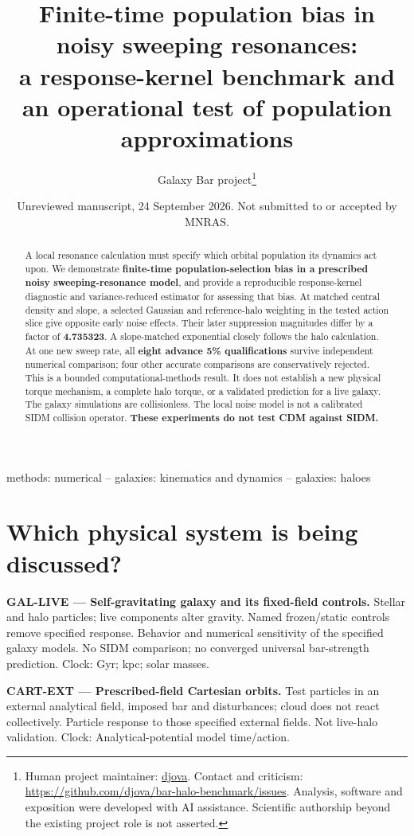 \documentclass[fleqn,usenatbib]{mnras}
\title[Population bias in noisy resonances]{Finite-time population bias in noisy sweeping resonances:\\
 a response-kernel benchmark and an operational test of population approximations}
\author[Galaxy Bar project]{Galaxy Bar project\thanks{Human project maintainer: \href{https://github.com/djova}{djova}.
Contact and criticism: \url{https://github.com/djova/bar-halo-benchmark/issues}.
Analysis, software and exposition were developed with AI assistance. Scientific authorship beyond the existing project role is not asserted.}}
\date{Unreviewed manuscript, 24 September 2026. Not submitted to or accepted by MNRAS.}
\begin{document}
\label{firstpage}
\pagerange{\pageref{firstpage}--\pageref{LastPage}}
\maketitle

\begin{abstract}
A local resonance calculation must specify which orbital population its dynamics act upon. We demonstrate \textbf{finite-time population-selection bias in a prescribed noisy sweeping-resonance model}, and provide a reproducible response-kernel diagnostic and variance-reduced estimator for assessing that bias. At matched central density and slope, a selected Gaussian and reference-halo weighting in the tested action slice give opposite early noise effects. Their later suppression magnitudes differ by a factor of \textbf{4.735323}. A slope-matched exponential closely follows the halo calculation. At one new sweep rate, all \textbf{eight advance 5\% qualifications} survive independent numerical comparison; four other accurate comparisons are conservatively rejected. This is a bounded computational-methods result. It does not establish a new physical torque mechanism, a complete halo torque, or a validated prediction for a live galaxy. The galaxy simulations are collisionless. The local noise model is not a calibrated SIDM collision operator. \textbf{These experiments do not test CDM against SIDM.}
\end{abstract}
\begin{keywords}
methods: numerical -- galaxies: kinematics and dynamics -- galaxies: haloes
\end{keywords}
\section{Which physical system is being discussed?}\label{models}

\textbf{GAL-LIVE --- Self-gravitating galaxy and its fixed-field controls.} Stellar and halo particles; live components alter gravity. Named frozen/static controls remove specified response. Behavior and numerical sensitivity of the specified galaxy models. No SIDM comparison; no converged universal bar-strength prediction. Clock: Gyr; kpc; solar masses.

\textbf{CART-EXT --- Prescribed-field Cartesian orbits.} Test particles in an external analytical field, imposed bar and disturbances; cloud does not react collectively. Particle response to those specified external fields. Not live-halo validation. Clock: Analytical-potential model time/action.
\end{document}
